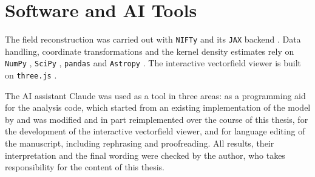 \thispagestyle{empty}
\chapter*{Software and AI Tools}

The field reconstruction was carried out with \texttt{NIFTy} \citep{Edenhofer2024,niftycl} and its
\texttt{JAX} backend \citep{JAX}. Data handling, coordinate transformations and the kernel density
estimates rely on \texttt{NumPy} \citep{Harris2020}, \texttt{SciPy} \citep{Virtanen2020},
\texttt{pandas} \citep{McKinney2010} and \texttt{Astropy} \citep{AstropyCollaboration2022}.
The interactive vectorfield viewer is built on \texttt{three.js} \citep{Threejs}.

The AI assistant Claude \citep{Claude} was used as a tool in three areas: as a programming aid for
the analysis code, which started from an existing implementation of the model by \citet{Hutschenreuter2026} and was modified and
in part reimplemented over the course of this thesis, for the development of the interactive
vectorfield viewer, and for language editing of the manuscript, including rephrasing and
proofreading. All results, their interpretation and the final wording were checked by the author, who takes
responsibility for the content of this thesis.
